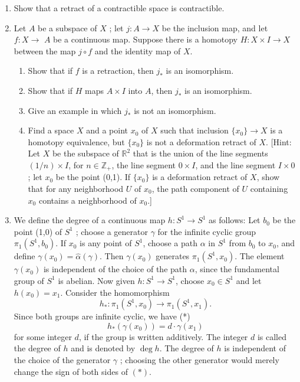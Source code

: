 \begin{enumerate}[itemsep=0.4em, parsep=0pt, topsep=0pt, partopsep=0pt, leftmargin=*, label=\arabic*., ref=\arabic*]
\item Show that a retract of a contractible space is contractible.
\item Let \(A\) be a subspace of \(X\) ; let \(j : A \rightarrow X\) be the inclusion map, and let \(f : X \rightarrow\) \(A\) be a continuous map. Suppose there is a homotopy \(H : X \times I \rightarrow X\) between the map \(j \circ f\) and the identity map of \(X\).
 \begin{enumerate}[itemsep=0.2em, parsep=0pt, topsep=0pt, partopsep=0pt, leftmargin=*, label=(\alph*), align=left]
 \item Show that if \(f\) is a retraction, then \(j_{ * }\) is an isomorphism.
 \item Show that if \(H\) maps \(A \times I\) into \(A\), then \(j_{ * }\) is an isomorphism.
 \item Give an example in which \(j_{ * }\) is not an isomorphism.
\item[*8.] Find a space \(X\) and a point \(x_{0}\) of \(X\) such that inclusion \(\{ x_{0}\} \rightarrow X\) is a homotopy equivalence, but \(\{ x_{0}\}\) is not a deformation retract of \(X\). [Hint: Let \(X\) be the subspace of \(\mathbb{R}^{2}\) that is the union of the line segments \(( {1/n}) \times I\), for \(n \in {\mathbb{Z}}_{ + }\), the line segment \(0 \times I\), and the line segment \(I \times 0\) ; let \(x_{0}\) be the point (0,1). If \(\{ x_{0}\}\) is a deformation retract of \(X\), show that for any neighborhood \(U\) of \(x_{0}\), the path component of \(U\) containing \(x_{0}\) contains a neighborhood of \(x_{0}\).]
 \end{enumerate}
\item[9.] We define the degree of a continuous map \(h : S^{1} \rightarrow {S}^{1}\) as follows: Let \(b_{0}\) be the point (1,0) of \(S^{1}\) ; choose a generator \(\gamma\) for the infinite cyclic group \({\pi }_{1}( {S^{1},b_{0}})\). If \(x_{0}\) is any point of \(S^{1}\), choose a path \(\alpha\) in \(S^{1}\) from \(b_{0}\) to \(x_{0}\), and define \(\gamma ( x_{0}) = \hat{\alpha }( \gamma )\). Then \(\gamma ( x_{0})\) generates \({\pi }_{1}( {S^{1},x_{0}})\). The element \(\gamma ( x_{0})\) is independent of the choice of the path \(\alpha\), since the fundamental group of \(S^{1}\) is abelian. Now given \(h : S^{1} \rightarrow {S}^{1}\), choose \(x_{0} \in {S}^{1}\) and let \(h( x_{0}) = x_{1}\). Consider the homomorphism \[ h_{ * } : {\pi }_{1}( {S^{1},x_{0}}) \rightarrow {\pi }_{1}( {S^{1},x_{1}}). \] Since both groups are infinite cyclic, we have (*) \[ h_{ * }( {\gamma ( x_{0}) }) = d \cdot \gamma ( x_{1}) \] for some integer \(d\), if the group is written additively. The integer \(d\) is called the degree of \(h\) and is denoted by \(\deg h\). The degree of \(h\) is independent of the choice of the generator \(\gamma\) ; choosing the other generator would merely change the sign of both sides of \(( *)\).

\end{enumerate}
